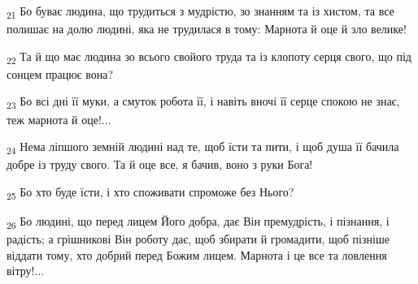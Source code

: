 \begin{tcolorbox}
\textsubscript{21} Бо буває людина, що трудиться з мудрістю, зо знанням та із хистом, та все полишає на долю людині, яка не трудилася в тому: Марнота й оце й зло велике!
\end{tcolorbox}
\begin{tcolorbox}
\textsubscript{22} Та й що має людина зо всього свойого труда та із клопоту серця свого, що під сонцем працює вона?
\end{tcolorbox}
\begin{tcolorbox}
\textsubscript{23} Бо всі дні її муки, а смуток робота її, і навіть вночі її серце спокою не знає, теж марнота й оце!...
\end{tcolorbox}
\begin{tcolorbox}
\textsubscript{24} Нема ліпшого земній людині над те, щоб їсти та пити, і щоб душа її бачила добре із труду свого. Та й оце все, я бачив, воно з руки Бога!
\end{tcolorbox}
\begin{tcolorbox}
\textsubscript{25} Бо хто буде їсти, і хто споживати спроможе без Нього?
\end{tcolorbox}
\begin{tcolorbox}
\textsubscript{26} Бо людині, що перед лицем Його добра, дає Він премудрість, і пізнання, і радість; а грішникові Він роботу дає, щоб збирати й громадити, щоб пізніше віддати тому, хто добрий перед Божим лицем. Марнота і це все та ловлення вітру!...
\end{tcolorbox}
